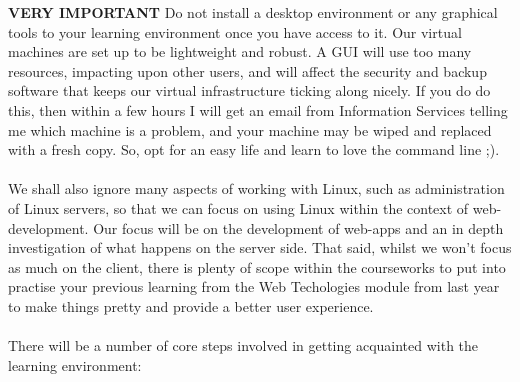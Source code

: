 \documentclass[12pt, a4paper, oneside]{book}
\begin{document}
\begin{framed}
\textbf{VERY IMPORTANT} Do not install a desktop environment or any graphical tools to your learning environment once you have access to it. Our virtual machines are set up to be lightweight and robust. A GUI will use too many resources, impacting upon other users, and will affect the security and backup software that keeps our virtual infrastructure ticking along nicely. If you do do this, then within a few hours I will get an email from Information Services telling me which machine is a problem, and your machine may be wiped and replaced with a fresh copy. So, opt for an easy life and learn to love the command line ;).
\end{framed}

\paragraph{} We shall also ignore many aspects of working with Linux, such as administration of Linux servers, so that we can focus on using Linux within the context of web-development. Our focus will be on the development of web-apps and an in depth investigation of what happens on the server side. That said, whilst we won't focus as much on the client, there is plenty of scope within the courseworks to put into practise your previous learning from the Web Techologies module from last year to make things pretty and provide a better user experience.

\paragraph{} There will be a number of core steps involved in getting acquainted with the learning environment:
\end{document}
